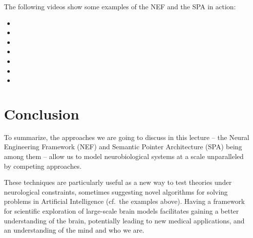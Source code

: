 \documentclass[10pt,letterpaper,oneside]{article}
\begin{document}
The following videos show some examples of the NEF and the SPA in action:
\begin{multicols}{2}
	\begin{itemize}
		\setlength{\itemsep}{0cm}
		\item {}
		\item {}
		\item {}
		\item {}
		\item {}
		\item {}
		\item {}
	\end{itemize}
\end{multicols}

\section{Conclusion}

To summarize, the approaches we are going to discuss in this lecture -- the Neural Engineering Framework (NEF) and Semantic Pointer Architecture (SPA) being among them -- allow us to model neurobiological systems at a scale unparalleled by competing approaches.

These techniques are particularly useful as a new way to test theories under neurological constraints, sometimes suggesting novel algorithms for solving problems in Artificial Intelligence (cf.~the examples above). Having a framework for scientific exploration of large-scale brain models facilitates gaining a better understanding of the brain, potentially leading to new medical applications, and an understanding of the mind and who we are.

\printbibliography
\end{document}
